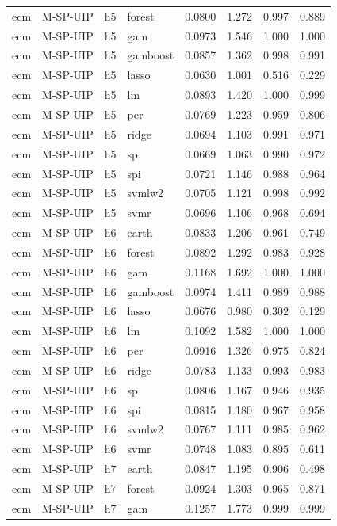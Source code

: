 \begin{ThreePartTable}
\begin{longtable}[t]{llclcccc}
ecm & M-SP-UIP & h5 & forest & 0.0800 & 1.272 & 0.997 & 0.889\\
ecm & M-SP-UIP & h5 & gam & 0.0973 & 1.546 & 1.000 & 1.000\\
ecm & M-SP-UIP & h5 & gamboost & 0.0857 & 1.362 & 0.998 & 0.991\\
ecm & M-SP-UIP & h5 & lasso & 0.0630 & 1.001 & 0.516 & 0.229\\
ecm & M-SP-UIP & h5 & lm & 0.0893 & 1.420 & 1.000 & 0.999\\
ecm & M-SP-UIP & h5 & pcr & 0.0769 & 1.223 & 0.959 & 0.806\\
ecm & M-SP-UIP & h5 & ridge & 0.0694 & 1.103 & 0.991 & 0.971\\
ecm & M-SP-UIP & h5 & sp & 0.0669 & 1.063 & 0.990 & 0.972\\
ecm & M-SP-UIP & h5 & spi & 0.0721 & 1.146 & 0.988 & 0.964\\
ecm & M-SP-UIP & h5 & svmlw2 & 0.0705 & 1.121 & 0.998 & 0.992\\
ecm & M-SP-UIP & h5 & svmr & 0.0696 & 1.106 & 0.968 & 0.694\\
\addlinespace
ecm & M-SP-UIP & h6 & earth & 0.0833 & 1.206 & 0.961 & 0.749\\
ecm & M-SP-UIP & h6 & forest & 0.0892 & 1.292 & 0.983 & 0.928\\
ecm & M-SP-UIP & h6 & gam & 0.1168 & 1.692 & 1.000 & 1.000\\
ecm & M-SP-UIP & h6 & gamboost & 0.0974 & 1.411 & 0.989 & 0.988\\
ecm & M-SP-UIP & h6 & lasso & 0.0676 & 0.980 & 0.302 & 0.129\\
ecm & M-SP-UIP & h6 & lm & 0.1092 & 1.582 & 1.000 & 1.000\\
ecm & M-SP-UIP & h6 & pcr & 0.0916 & 1.326 & 0.975 & 0.824\\
ecm & M-SP-UIP & h6 & ridge & 0.0783 & 1.133 & 0.993 & 0.983\\
ecm & M-SP-UIP & h6 & sp & 0.0806 & 1.167 & 0.946 & 0.935\\
ecm & M-SP-UIP & h6 & spi & 0.0815 & 1.180 & 0.967 & 0.958\\
ecm & M-SP-UIP & h6 & svmlw2 & 0.0767 & 1.111 & 0.985 & 0.962\\
ecm & M-SP-UIP & h6 & svmr & 0.0748 & 1.083 & 0.895 & 0.611\\
\addlinespace
ecm & M-SP-UIP & h7 & earth & 0.0847 & 1.195 & 0.906 & 0.498\\
ecm & M-SP-UIP & h7 & forest & 0.0924 & 1.303 & 0.965 & 0.871\\
ecm & M-SP-UIP & h7 & gam & 0.1257 & 1.773 & 0.999 & 0.999\\

\end{longtable}
\end{ThreePartTable}
